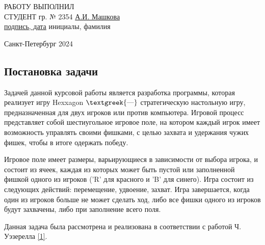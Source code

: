 \documentclass[a4paper]{article}
\begin{document}
\vspace{4cm}

\begin{flushleft}
    РАБОТУ ВЫПОЛНИЛ \\
    СТУДЕНТ гр. № 2354 
    \qquad \qquad \qquad \qquad \qquad \qquad \qquad \qquad \qquad \qquad \qquad \qquad \qquad\qquad 
    \underline{А.И. Машкова} \\
    \qquad \qquad \qquad \qquad\qquad \qquad \qquad \qquad\qquad \qquad \quad \underline{подпись, дата}
    \qquad \qquad \qquad \qquad \qquad инициалы, фамилия
\end{flushleft}

\vspace{3cm}

\begin{center}
    Санкт-Петербург 2024
\end{center}

\vspace{2cm}

 \thispagestyle{empty}

\tableofcontents 

\newpage 

\begin{center}
   \section{Постановка задачи} 
\end{center}

Задачей данной курсовой работы является разработка программы, которая реализует игру
{\textquotedbl}Hexxagon{\textquotedbl} $\text{\textgreek{—}}$ стратегическую настольную игру, предназначенная для двух
игроков или против компьютера. Игровой процесс представляет собой шестиугольное игровое поле, на котором каждый игрок
имеет возможность управлять своими фишками, с целью захвата и удержания чужих фишек, чтобы в итоге одержать победу.

Игровое поле имеет размеры, варьирующиеся в зависимости от выбора игрока, и состоит из ячеек, каждая из которых может
быть пустой или заполненной фишкой одного из игроков ('R' для красного и 'B' для синего). Игра состоит из следующих
действий: перемещение, удвоение, захват. Игра завершается, когда один из игроков больше не может сделать ход, либо все
фишки одного из игроков будут захвачены, либо при заполнение всего поля.

Данная задача была рассмотрена и реализована в соответствии с работой Ч. Уэзерелла \hyperlink{mytextlabel1}{[1]}.
\end{document}
